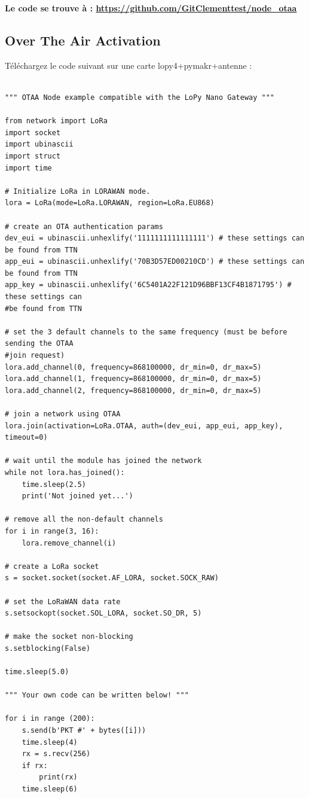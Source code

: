 \documentclass{article}
\begin{document}
\textbf{Le code se trouve à : \url{https://github.com/GitClementtest/node_otaa}}

\subsection{Over The Air Activation}
Téléchargez le code suivant sur une carte lopy4+pymakr+antenne :

\begin{verbatim}

""" OTAA Node example compatible with the LoPy Nano Gateway """

from network import LoRa
import socket
import ubinascii
import struct
import time

# Initialize LoRa in LORAWAN mode.
lora = LoRa(mode=LoRa.LORAWAN, region=LoRa.EU868)

# create an OTA authentication params
dev_eui = ubinascii.unhexlify('1111111111111111') # these settings can be found from TTN
app_eui = ubinascii.unhexlify('70B3D57ED00210CD') # these settings can be found from TTN
app_key = ubinascii.unhexlify('6C5401A22F121D96BBF13CF4B1871795') # these settings can 
#be found from TTN

# set the 3 default channels to the same frequency (must be before sending the OTAA 
#join request)
lora.add_channel(0, frequency=868100000, dr_min=0, dr_max=5)
lora.add_channel(1, frequency=868100000, dr_min=0, dr_max=5)
lora.add_channel(2, frequency=868100000, dr_min=0, dr_max=5)

# join a network using OTAA
lora.join(activation=LoRa.OTAA, auth=(dev_eui, app_eui, app_key), timeout=0)

# wait until the module has joined the network
while not lora.has_joined():
    time.sleep(2.5)
    print('Not joined yet...')

# remove all the non-default channels
for i in range(3, 16):
    lora.remove_channel(i)

# create a LoRa socket
s = socket.socket(socket.AF_LORA, socket.SOCK_RAW)

# set the LoRaWAN data rate
s.setsockopt(socket.SOL_LORA, socket.SO_DR, 5)

# make the socket non-blocking
s.setblocking(False)

time.sleep(5.0)

""" Your own code can be written below! """

for i in range (200):
    s.send(b'PKT #' + bytes([i]))
    time.sleep(4)
    rx = s.recv(256)
    if rx:
        print(rx)
    time.sleep(6)


\end{verbatim}
\end{document}
